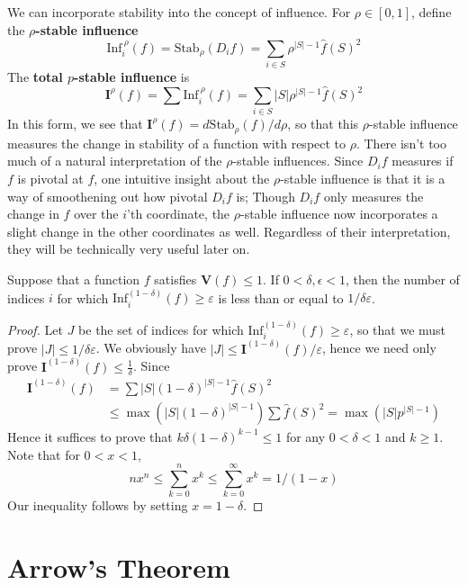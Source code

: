 We can incorporate stability into the concept of influence. For $\rho \in [0,1]$, define the {\bf $\rho$-stable influence}
%
\[ \text{Inf}_i^{\ \rho}(f) = \text{Stab}_\rho(D_i f) = \sum_{i \in S} \rho^{|S| - 1} \widehat{f}(S)^2 \]
%
The {\bf total $p$-stable influence} is
%
\[ \mathbf{I}^{\rho}(f) = \sum \text{Inf}_i^{\ \rho}(f) = \sum_{i \in S} |S| \rho^{|S|-1} \widehat{f}(S)^2 \]
%
In this form, we see that $\mathbf{I}^{\rho}(f) = d\text{Stab}_\rho(f)/d\rho$, so that this $\rho$-stable influence measures the change in stability of a function with respect to $\rho$. There isn't too much of a natural interpretation of the $\rho$-stable influences. Since $D_if$ measures if $f$ is pivotal at $f$, one intuitive insight about the $\rho$-stable influence is that it is a way of smoothening out how pivotal $D_if$ is; Though $D_if$ only measures the change in $f$ over the $i$'th coordinate, the $\rho$-stable influence now incorporates a slight change in the other coordinates as well. Regardless of their interpretation, they will be technically very useful later on.

\begin{theorem}
    Suppose that a function $f$ satisfies $\mathbf{V}(f) \leq 1$. If $0 < \delta, \epsilon < 1$, then the number of indices $i$ for which $\text{Inf}^{(1 - \delta)}_i(f) \geq \varepsilon$ is less than or equal to $1/\delta\varepsilon$.
\end{theorem}
\begin{proof}
    Let $J$ be the set of indices for which $\text{Inf}^{(1 - \delta)}_i(f) \geq \varepsilon$, so that we must prove $|J| \leq 1/\delta\varepsilon$. We obviously have $|J| \leq \mathbf{I}^{(1 - \delta)}(f)/\varepsilon$, hence we need only prove $\mathbf{I}^{(1 - \delta)}(f) \leq \frac{1}{\delta}$. Since
    \begin{align*}
        \mathbf{I}^{(1 - \delta)}(f) &= \sum |S| (1 - \delta)^{|S|-1} \widehat{f}(S)^2\\
        &\leq \max(|S| (1 - \delta)^{|S|-1}) \sum \widehat{f}(S)^2 = \max(|S| p^{|S|-1})
    \end{align*}
    Hence it suffices to prove that $k\delta (1 - \delta)^{k - 1} \leq 1$ for any $0 < \delta < 1$ and $k \geq 1$. Note that for $0 < x < 1$,
    \[ nx^n \leq \sum_{k = 0}^n x^k \leq \sum_{k = 0}^\infty x^k = 1/(1 - x) \]
    Our inequality follows by setting $x = 1 - \delta$.
\end{proof}

\section{Arrow's Theorem}

